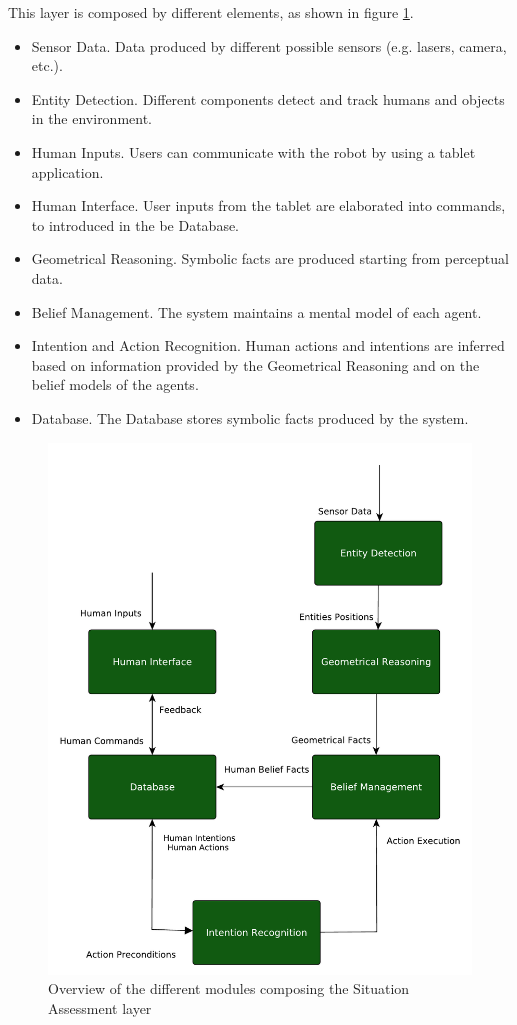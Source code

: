 This layer is composed by different elements, as shown in figure \ref{fig:situation_assessment-situation_assessment_overview}.
\begin{itemize}
\item Sensor Data. Data produced by different possible sensors (e.g. lasers, camera, etc.).
\item Entity Detection. Different components detect and track humans and objects in the environment.
\item Human Inputs. Users can communicate with the robot by using a tablet application.
\item Human Interface. User inputs from the tablet are elaborated into commands, to introduced in the be Database.
\item Geometrical Reasoning. Symbolic facts are produced starting from perceptual data.
\item Belief Management. The system maintains a mental model of each agent.
\item Intention and Action Recognition. Human actions and intentions are inferred based on information provided by the Geometrical Reasoning and on the belief models of the agents.
\item Database. The Database stores symbolic facts produced by the system.
\end{itemize}


 \begin{figure}[ht!]
	\centering
	\includegraphics[scale=0.45]{img/situation_assessment/situation_assessment_overview}
	\caption{Overview of the different modules composing the Situation Assessment layer}
	\label{fig:situation_assessment-situation_assessment_overview}
\end{figure}

